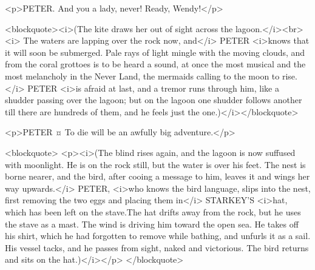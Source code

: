 <p>PETER. And you a lady, never!
Ready, Wendy!</p>

<blockquote><i>(The kite draws her out of sight across the lagoon.</i><br> <i> The waters are lapping over the rock now, and</i> PETER <i>knows that it will soon be submerged. Pale rays of light mingle with the moving clouds, and from the coral grottoes is to be heard a sound, at once the most musical and the most melancholy in the Never Land, the mermaids calling to the moon to rise.</i> PETER <i>is afraid at last, and a tremor runs through him, like a shudder passing over the lagoon; but on the lagoon one shudder follows another till there are hundreds of them, and he feels just the one.)</i></blockquote>

<p>PETER ¤
To die will be an awfully big adventure.</p>

<blockquote> <p><i>(The blind rises again, and the lagoon is now suffused with moonlight. He is on the rock still, but the water is over his feet. The nest is borne nearer, and the bird, after cooing a message to him, leaves it and wings her way upwards.</i> PETER, <i>who knows the bird language, slips into the nest, first removing the two eggs and placing them in</i> STARKEY'S <i>hat, which has been left on the stave.The hat drifts away from the rock, but he uses the stave as a mast. The wind is driving him toward the open sea. He takes off his shirt, which he had forgotten to remove while bathing, and unfurls it as a sail. His vessel tacks, and he passes from sight, naked and victorious. The bird returns and sits on the hat.)</i></p> </blockquote>

